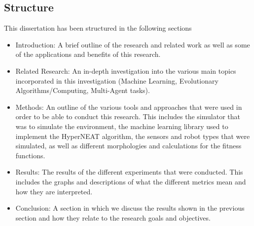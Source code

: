 \subsection{Structure}
This dissertation has been structured in the following sections
\begin{itemize}
	\item Introduction: A brief outline of the research and related work as well as some of the applications and benefits of this research.
	\item Related Research: An in-depth investigation into the various main topics incorporated in this investigation (Machine Learning, Evolutionary Algorithms/Computing, Multi-Agent tasks).
	\item Methods: An outline of the various tools and approaches that were used in order to be able to conduct this research. This includes the simulator that was to simulate the environment, the machine learning library used to implement the HyperNEAT algorithm, the sensors and robot types that were simulated, as well as different morphologies and calculations for the fitness functions.
	\item Results: The results of the different experiments that were conducted. This includes the graphs and descriptions of what the different metrics mean and how they are interpreted.
	\item Conclusion: A section in which we discuss the results shown in the previous section and how they relate to the research goals and objectives.
\end{itemize}



